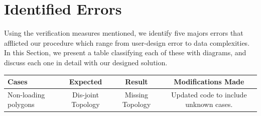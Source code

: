 \section{Identified Errors}
Using the verification measures mentioned, we identify five majors errors that afflicted our procedure which range from user-design error to data complexities. In this Section, we present a table classifying each of these with diagrams, and discuss each one in detail with our designed solution.

\begin{table}
\footnotesize
\begin{tabularx}{\textwidth}{|m{1.5cm}|C|C|C|}
\hline
\centering Cases&Expected&Result&Modifications Made \\ \hline
\centering Non-loading polygons &   Dis-joint Topology&  Missing Topology& Updated code to include unknown cases.\\ \hline

\end{tabularx}
\end{table}
